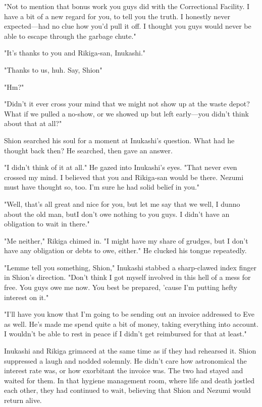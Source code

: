 "Not to mention that bonus work you guys did with the Correctional
Facility. I have a bit of a new regard for you, to tell you the truth. I
honestly never expected---had no clue how you'd pull it off. I thought you
guys would never be able to escape through the garbage chute."

"It's thanks to you and Rikiga-san, Inukashi."

"Thanks to us, huh. Say, Shion\el "

"Hm?"

"Didn't it ever cross your mind that we might not show up at the waste
depot? What if we pulled a no-show, or we showed up but left early---you
didn't think about that at all?"

Shion searched his soul for a moment at Inukashi's question. What had he
thought back then? He searched, then gave an answer.

"I didn't think of it at all." He gazed into Inukashi's eyes. "That
never even crossed my mind. I believed that you and Rikiga-san would be
there. Nezumi must have thought so, too. I'm sure he had solid belief in
you."

"Well, that's all great and nice for you, but let me say that we\el 
well, I dunno about the old man, but\el I don't owe nothing to you guys.
I didn't have an obligation to wait in there."

"Me neither," Rikiga chimed in. "I might have my share of grudges, but I
don't have any obligation or debts to owe, either." He clucked his
tongue repeatedly.

"Lemme tell you something, Shion," Inukashi stabbed a sharp-clawed index
finger in Shion's direction. "Don't think I got myself involved in this
hell of a mess for free. You guys owe me now. You best be prepared,
'cause I'm putting hefty interest on it."

"I'll have you know that I'm going to be sending out an invoice
addressed to Eve as well. He's made me spend quite a bit of money,
taking everything into account. I wouldn't be able to rest in peace if I
didn't get reimbursed for that at least."

Inukashi and Rikiga grimaced at the same time as if they had rehearsed
it. Shion suppressed a laugh and nodded solemnly. He didn't care how
astronomical the interest rate was, or how exorbitant the invoice was.
The two had stayed and waited for them. In that hygiene management room,
where life and death jostled each other, they had continued to wait,
believing that Shion and Nezumi would return alive.

